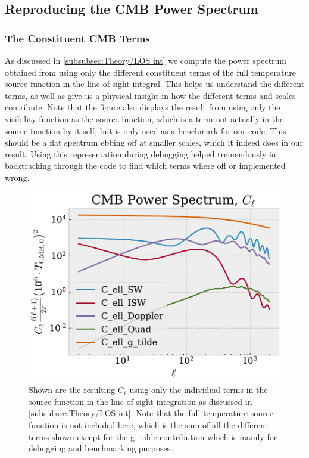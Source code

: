 \documentclass[10pt,a4paper]{article}
\begin{document}
\newpage
\subsection{Reproducing the CMB Power Spectrum}
\label{subsec:Results/CMB power spectrum}

\subsubsection{The Constituent CMB Terms}
\label{subsubsec:Results/CMB power spectrum terms}
As discussed in \cref{subsubsec:Theory/LOS int} we compute the power spectrum obtained from using only the different constituent terms of the full temperature source function in the line of sight integral. This helps us understand the different terms, as well as give us a physical insight in how the different terms and scales contribute. Note that the figure also displays the result from using only the visibility function as the source function, which is a term not actually in the source function by it self, but is only used as a benchmark for our code. This should be a flat spectrum ebbing off at smaller scales, which it indeed does in our result. Using this representation during debugging helped tremendously in backtracking through the code to find which terms where off or implemented wrong.
\begin{figure}[ht!]
  \centering
  \includegraphics[scale=0.5]{../figs/Cells_components.pdf}
  \caption{Shown are the resulting $C_\ell$ using only the individual terms in the source function in the line of sight integration as discussed in \cref{subsubsec:Theory/LOS int}. Note that the full temperature source function is not included here, which is the sum of all the different terms shown except for the \rm{g\_tilde} contribution which is mainly for debugging and benchmarking purposes.}
  \label{fig: Constituent Cell}
\end{figure}
\end{document}
